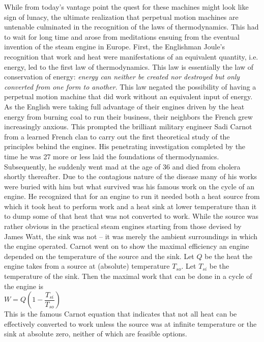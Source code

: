 \documentclass[11pt]{article} %
\numberwithin{equation}{section}
\begin{document}
While from today’s vantage point the quest for these machines might look like sign of lunacy, the ultimate realization that perpetual motion machines are untenable culminated in the recognition of the laws of thermodynamics. This had to wait for long time and arose from meditations ensuing from the eventual invention of the steam engine in Europe. First, the Englishman Joule’s recognition that work and heat were manifestations of an equivalent quantity, i.e. energy, led to the first law of thermodynamics. This law is essentially the law of conservation of energy: \textit{energy can neither be created nor destroyed but only converted from one form to another}. This law negated the possibility of having a perpetual motion machine that did work without an equivalent input of energy.\\

As the English were taking full advantage of their engines driven by the heat energy from burning coal to run their business, their neighbors the French grew increasingly anxious. This prompted the brilliant military engineer Sadi Carnot from a learned French clan to carry out the first theoretical study of the principles behind the engines. His penetrating investigation completed by the time he was 27 more or less laid the foundations of thermodynamics. Subsequently, he suddenly went mad at the age of 36 and died from cholera shortly thereafter. Due to the contagious nature of the disease many of his works were buried with him but what survived was his famous work on the cycle of an engine. He recognized that for an engine to run it needed both a heat source from which it took heat to perform work and a heat sink at lower temperature than it to dump some of that heat that was not converted to work. While the source was rather obvious in the practical steam engines starting from those devised by James Watt, the sink was not -- it was merely the ambient surroundings in which the engine operated. Carnot went on to show the maximal efficiency an engine depended on the temperature of the source and the sink. Let $Q$ be the heat the engine takes from a source at (absolute) temperature $T_{so}$. Let $T_{si}$ be the temperature of the sink. Then the maximal work that can be done in a cycle of the engine is\\

 $W=Q\left(1-\dfrac{T_{si}}{T_{so}}\right)$\\
 
 This is the famous Carnot equation that indicates that not all heat can be effectively converted to work unless the source was at infinite temperature or the sink at absolute zero, neither of which are feasible options.\\
 
\end{document}
